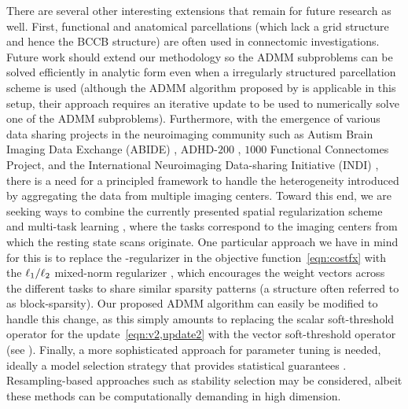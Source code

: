There are several other interesting extensions that remain for future research as well.
First, functional and anatomical parcellations (which lack a grid structure and hence the BCCB structure) are often used in connectomic investigations.  
Future work should extend our methodology so the ADMM subproblems can be solved efficiently in analytic form even when a irregularly structured parcellation scheme is used (although the ADMM algorithm proposed by \cite{Gui-Bo-Ye:2011} is applicable in this setup, their approach requires an iterative update to be used to numerically solve one of the ADMM subproblems).
Furthermore, with the emergence of various data sharing projects in the neuroimaging community such as Autism Brain Imaging Data Exchange (ABIDE) \citep{Martino:2013}, ADHD-$200$ \citep{ADHD200}, $1000$ Functional Connectomes Project, and the International Neuroimaging Data-sharing Initiative (INDI) \citep{Mennes:2012}, there is a need for a principled framework to handle the heterogeneity introduced by aggregating the data from multiple imaging centers.
Toward this end, we are seeking ways to combine the currently presented spatial regularization scheme and multi-task learning \citep{Caruana:1997}, where the tasks correspond to the imaging centers from which the resting state scans originate.
One particular approach we have in mind for this is to replace the \ellone-regularizer in the objective function~\eqref{eqn:costfx} with the $\ell_1/\ell_2$ mixed-norm regularizer \citep{Lounici:2009, Gramfort:2012}, which encourages the weight vectors across the different tasks to share similar sparsity patterns (a structure often referred to as block-sparsity).
Our proposed ADMM algorithm can easily be modified to handle this change, as this simply amounts to replacing the scalar soft-threshold operator for the \vb update~\eqref{eqn:v2,update2} with the vector soft-threshold operator (see \cite{Gramfort:2012}).
Finally, a more sophisticated approach for parameter tuning is needed, ideally a model selection strategy that provides statistical guarantees \citep{Cawley:2010}. 
Resampling-based approaches  \citep{Bach:2008c,Varoquaux:2012} such as stability selection \citep{Meinshausen:2010} may be considered, albeit these methods can be computationally demanding in high dimension. 
